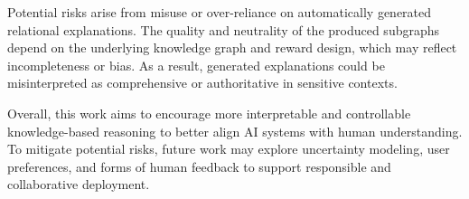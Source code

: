 \documentclass{article}
\theoremstyle{plain}
\theoremstyle{definition}
\theoremstyle{remark}
\begin{document}
Potential risks arise from misuse or over-reliance on automatically generated relational explanations. The quality and neutrality of the produced subgraphs depend on the underlying knowledge graph and reward design, which may reflect incompleteness or bias. As a result, generated explanations could be misinterpreted as comprehensive or authoritative in sensitive contexts.

Overall, this work aims to encourage more interpretable and controllable knowledge-based reasoning to better align AI systems with human understanding. To mitigate potential risks, future work may explore uncertainty modeling, user preferences, and forms of human feedback to support responsible and collaborative deployment.




\newpage
\appendix
\onecolumn




\end{document}
